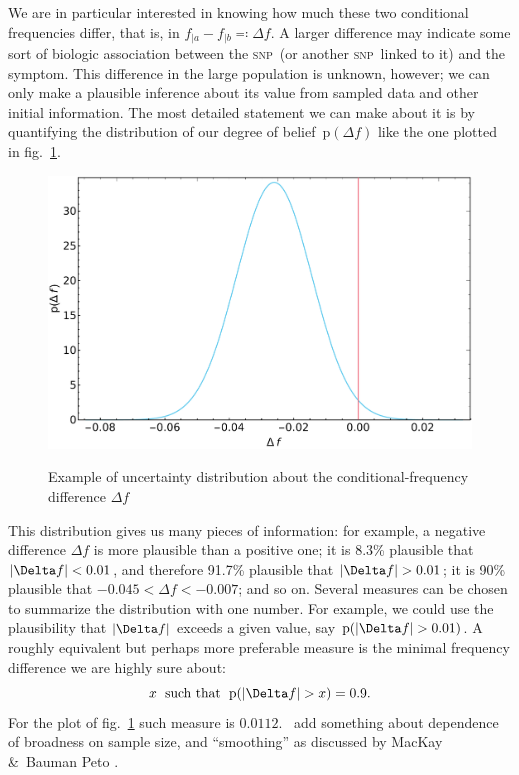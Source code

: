 \documentclass[\ifafour a4paper,12pt,\else a5paper,10pt,\fi%
onecolumn,oneside,article,%
british%
]{memoir}
\theoremstyle{remark}
\theoremstyle{innote}
\newcommand*{\citey}{\parencites*}
\newcommand*{\amp}{\&}
\newcommand*{\defs}{\eqqcolon}
\DeclarePairedDelimiter\abs{\lvert}{\rvert}
\newcommand*{\pf}{\mathrm{p}}%
\renewcommand*{\|}{\mathpunct{|}}
\newcommand*{\sect}{\S}%
\newcommand*{\fig}{fig.}%
\newcommand*{\puzzle}{\maltese}
\newcommand{\mynote}[1]{ {\color{notecolour}\puzzle\ #1}}
\newcommand*{\dob}{degree of belief}
\newcommand*{\snp}{\textsc{snp}}
\newcommand*{\ya}{a}
\newcommand*{\yb}{b}
\newcommand*{\df}{\Delta f}
\begin{document}
We are in particular interested in knowing how much these two conditional
frequencies differ, that is, in $f_{|\ya}-f_{|\yb} \defs \df$. A larger
difference may indicate some sort of biologic association between the \snp\
(or another \snp\ linked to it) and the symptom. This difference in the
large population is unknown, however; we can only make a plausible
inference about its value from sampled data and other initial information.
The most detailed statement we can make about it is by quantifying the
distribution of our \dob\ $\pf(\df)$ like the one plotted in
\fig~\ref{fig:example_difference_distributions}.
\begin{figure}[t!]%
 \centering\includegraphics[width=0.75\linewidth]{example_diff.pdf}\\
 \caption{Example of uncertainty distribution about the conditional-frequency
   difference $\df$}\label{fig:example_difference_distributions}
\end{figure}%
This distribution gives us many pieces of information: for example, a
negative difference $\df$ is more plausible than a positive one; it is
8.3\% plausible that $\abs{\df}<0.01$, and therefore 91.7\% plausible that
$\abs{\df}>0.01$; it is 90\% plausible that $-0.045 < \df < -0.007$; and so
on. Several measures can be chosen to summarize the distribution with one
number. For example, we could use the plausibility that $\abs{\df}$ exceeds
a given value, say $\pf(\abs{\df} > 0.01)$. A roughly equivalent but
perhaps more preferable measure is the minimal frequency difference we are
highly sure about:
\begin{equation}\label{eq:significance_measure}
x\;\text{ such that }\; \pf(\abs{\df} > x)=0.9.
\end{equation}
For the plot of
\fig~\ref{fig:example_difference_distributions} such measure is $0.0112$.
\mynote{add something about dependence of broadness on sample size, and
  \enquote{smoothing} as discussed by MacKay \amp\ Bauman Peto
  \citey[\sect~2.6]{mackayetal1995}.}
\end{document}
